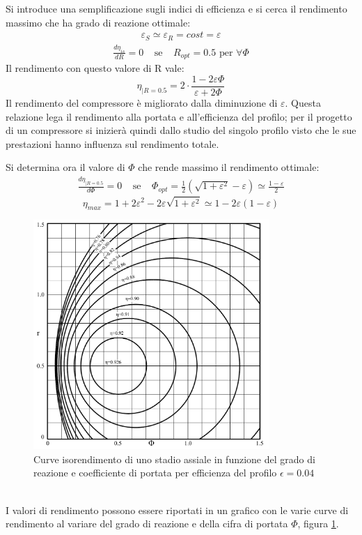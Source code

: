 Si introduce una semplificazione sugli indici di efficienza e si cerca il rendimento massimo che ha grado di reazione ottimale:
\begin{align*}
\varepsilon_S \simeq \varepsilon_R = cost = \varepsilon
\end{align*}
\begin{align*}
\frac{d \eta_{is}}{dR} = 0 \;\;\;\; \text{se}  \;\;\;\; R_{opt} = 0.5 \mbox{ per } \forall \Phi
\end{align*}
Il rendimento con questo valore di R vale:
\begin{equation}
\eta_{|R= 0.5} = 2 \cdot \frac{1- 2 \varepsilon \Phi}{\varepsilon + 2 \Phi}
\end{equation}
Il rendimento del compressore è migliorato dalla diminuzione di $\varepsilon$. Questa relazione lega il rendimento alla portata e all'efficienza del profilo; per il progetto di un compressore si inizierà quindi dallo studio del singolo profilo visto che le sue prestazioni hanno influenza sul rendimento totale.

Si determina ora il valore di $\Phi$ che rende massimo il rendimento ottimale:
\begin{align*}
\frac{d\eta_{|R=0.5}}{d \Phi} = 0 \;\;\;\; \text{se} \;\;\;\; \Phi_{opt} = \frac{1}{2} \left( \sqrt{1 + \varepsilon^2} - \varepsilon \right) \simeq \frac{1 - \varepsilon}{2}
\end{align*}
\begin{equation}
\eta_{max} = 1 + 2 \varepsilon^2 - 2 \varepsilon \sqrt{1 + \varepsilon^2} \simeq 1 - 2 \varepsilon \left( 1 - \varepsilon \right)
\end{equation}
\begin{figure}[h!]
\centering
  \includegraphics[width=0.8\textwidth]{fig/IsoRendCompAss.pdf}
\caption{Curve isorendimento di uno stadio assiale in funzione del grado di reazione e coefficiente di portata per efficienza del profilo $\epsilon=0.04$}
\label{fig:isorendimento}
\end{figure}
\\I valori di rendimento possono essere riportati in un grafico con le varie curve di rendimento al variare del grado di reazione e della cifra di portata $\Phi$, figura \ref{fig:isorendimento}.

